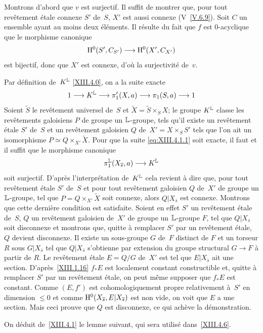 Montrons d'abord que $v$ est surjectif. Il suffit de montrer que, pour
tout rev\^etement \'etale connexe $S'$ de~$S$, $X'$ est aussi
connexe (V~\ref{V.6.9}). Soit $C$ un ensemble ayant au moins deux
\'el\'ements. Il r\'esulte du fait que $f$ est $0$-acyclique que
le morphisme canonique
$$
\H^0(S',C_{S'})\to \H^0(X',C_{X'})
$$
est bijectif, donc que $X'$ est connexe, d'o\`u la surjectivit\'e
de~$v$.

Par
d\'efinition de~$K^{\mathbb{L}}$ \eqref{XIII.4.0}, on a la suite exacte
$$
1\to K^{\LL} \to \pi_1'(X,a)\to \pi_1(S,a)\to 1
$$
Soient $\widetilde{S}$ le rev\^etement universel de~$S$ et
$\widetilde{X}=\widetilde{S}\times_SX$; le groupe $K^{\mathbb{L}}$ classe les
rev\^etements galoisiens $P$ de groupe un $\mathbb{L}$-groupe, tels qu'il
existe un rev\^etement \'etale $S'$ de~$S$ et un rev\^etement
galoisien $Q$ de~$X'=X\times_SS'$ tels que l'on ait un isomorphisme
$P\simeq Q\times_{X'}\widetilde{X}$. Pour que la suite
\eqref{eq:XIII.4.1.1} soit exacte, il faut et il suffit que le
morphisme canonique
$$
\pi_1^{\LL}(X_{\bar{s}},a)\to K^{\LL}
$$
soit surjectif. D'apr\`es l'interpr\'etation de~$K^{\mathbb{L}}$ cela
revient \`a dire que, pour tout rev\^etement \'etale $S'$ de~$S$
et pour tout rev\^etement galoisien $Q$ de~$X'$ de groupe un
$\mathbb{L}$-groupe, tel que $P=Q\times_{X'}\widetilde{X}$ soit connexe,
alors $Q|X_{\bar{s}}$ est connexe. Montrons que cette derni\`ere
condition est satisfaite. Soient en effet $S'$ un rev\^etement
\'etale de~$S$, $Q$ un rev\^etement galoisien de~$X'$ de groupe un
$\mathbb{L}$-groupe $F$, tel que $Q|X_{\bar{s}}$ soit disconnexe et montrons
que, quitte \`a remplacer $S'$ par un rev\^etement \'etale, $Q$
devient disconnexe. Il existe un sous-groupe $G$ de~$F$ distinct de
$F$ et un torseur $R$ sous $G|X_{\bar{s}}$ tel que $Q|X_{\bar{s}}$
s'obtienne par extension du groupe structural $G\to F$ \`a partir de
$R$. Le rev\^etement \'etale $E=Q/G$ de~$X'$ est tel que
$E|X_{\bar{s}}$ ait une section. D'apr\`es~\ref{XIII.1.16} $f_*E$
est localement constant constructible et, quitte \`a remplacer $S'$
par un rev\^etement \'etale, on peut m\^eme supposer que $f_*E$
est constant. Comme $(E,f')$ est cohomologiquement propre relativement
\`a~$S'$ en dimension $\leqslant0$ et comme $\mathrm{H}^0(X_{\overline{s}},
E|X_{\overline{s}})$ est non vide, on voit que $E$ a une section. Mais ceci
prouve que $Q$ est disconnexe, ce qui ach\`eve la d\'emonstration.

On d\'eduit de~\ref{XIII.4.1} le lemme suivant, qui sera utilis\'e
dans~\ref{XIII.4.6}.

